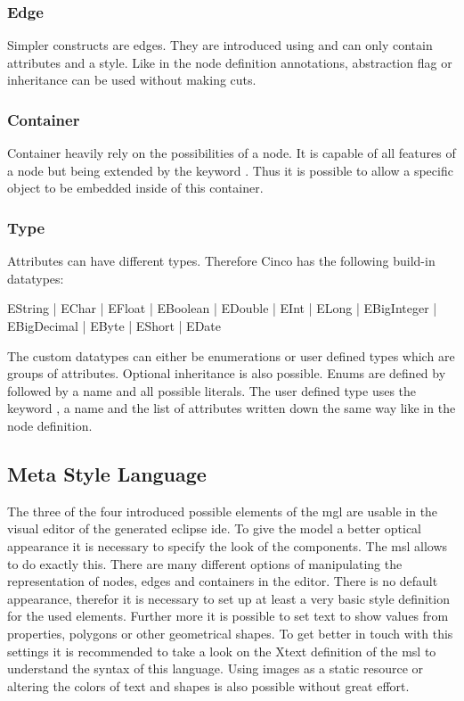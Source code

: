 \subsubsection{Edge}
Simpler constructs are edges. They are introduced using  and can only contain attributes and a style. Like in the node definition annotations, abstraction flag or inheritance can be used without making cuts.

\subsubsection{Container}
Container heavily rely on the possibilities of a node. It is capable of all features of a node but being extended by the keyword . Thus it is possible to allow a specific object to be embedded inside of this container.

\subsubsection{Type}
Attributes can have different types. Therefore Cinco has the following build-in datatypes:

\begin{center}
	EString | EChar | EFloat | EBoolean | EDouble | EInt | ELong | EBigInteger | EBigDecimal | EByte | EShort | EDate
\end{center}


The custom datatypes can either be enumerations or user defined types which are groups of attributes. Optional inheritance is also possible. Enums are defined by  followed by a name and all possible literals. The user defined type uses the keyword , a name and the list of attributes written down the same way like in the node definition.

\subsection{Meta Style Language}

The three of the four introduced possible elements of the \gls{mgl} are usable in the visual editor of the generated eclipse \gls{ide}. To give the model a better optical appearance it is necessary to specify the look of the components. The \gls{msl} allows to do exactly this. There are many different options of manipulating the representation of nodes, edges and containers in the editor. There is no default appearance, therefor it is necessary to set up at least a very basic style definition for the used elements. Further more it is possible to set text to show values from properties, polygons or other geometrical shapes. To get better in touch with this settings it is recommended to take a look on the Xtext definition of the \gls{msl} to understand the syntax of this language. Using images as a static resource or altering the colors of text and shapes is also possible without great effort.